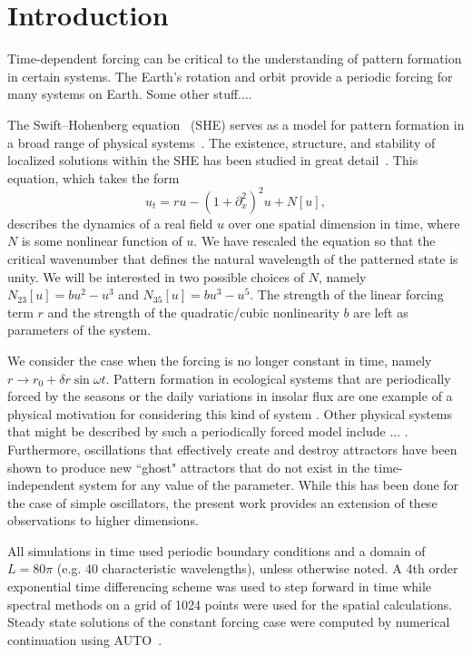 \documentclass[../main/TimeForcingSHE.tex]{subfiles}
\begin{document}
\section{Introduction}

Time-dependent forcing can be critical to the understanding of pattern formation in certain systems.  The Earth's rotation and orbit provide a periodic forcing for many systems on Earth.  Some other stuff....


The Swift--Hohenberg equation~\cite{swift1977} (SHE) serves as a model for pattern formation in a broad range of physical systems~\cite{}.  The existence, structure, and stability of localized solutions within the SHE has been studied in great detail~\cite{burke2006,burke2007snakes,burke2007stability}.   This equation, which takes the form  
\begin{equation}
u_t= r u-\left(1+\partial_{x}^2\right)^2u+N[u]\label{eq:SH},
\end{equation}
describes the dynamics of a real field $u$ over one spatial dimension in time, where $N$ is some nonlinear function of $u$.  We have rescaled the equation so that the critical wavenumber that defines the natural wavelength of the patterned state is unity.  We will be interested in two possible choices of $N$, namely $N_{23}[u]=bu^2-u^3$ and $N_{35}[u]=b u^3-u^5$.  The strength of the linear forcing term $r$ and the strength of the quadratic/cubic nonlinearity $b$ are left as parameters of the system.  

We consider the case when the forcing is no longer constant in time, namely $r\rightarrow r_0+\delta r \sin\omega t$.  Pattern formation in ecological systems that are periodically forced by the seasons or the daily variations in insolar flux are one example of a physical motivation for considering this kind of system \cite{}.  Other physical systems that might be described by such a periodically forced model include ... \cite{}.   Furthermore, oscillations that effectively create and destroy attractors have been shown to produce new ``ghost" attractors that do not exist in the time-independent system for any value of the parameter\cite{}.  While this has been done for the case of simple oscillators, the present work provides an extension of these observations to higher dimensions.




All simulations in time used periodic boundary conditions and a domain of $L=80\pi$ (e.g. 40 characteristic wavelengths), unless otherwise noted.  A 4th order exponential time differencing scheme\cite{cox2002} was used to step forward  in time while spectral methods on a grid of 1024 points were used for the spatial calculations.  Steady state solutions of the constant forcing case were computed by numerical continuation using AUTO~\cite{doedel1981auto}.  
\end{document}
